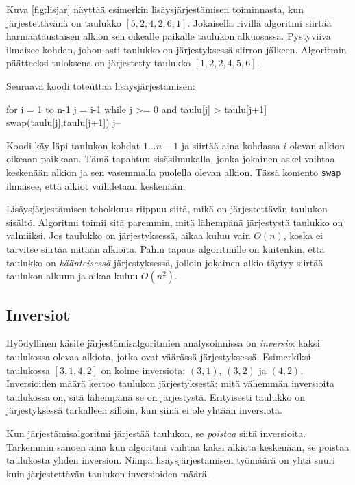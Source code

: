 Kuva \ref{fig:lisjar} näyttää esimerkin lisäysjärjestämisen
toiminnasta, kun järjes\-tettävänä on taulukko $[5,2,4,2,6,1]$.
Jokaisella rivillä algoritmi siirtää harmaataustaisen
alkion sen oikealle paikalle taulukon alkuosassa.
Pystyviiva ilmaisee kohdan, johon asti taulukko on järjestyksessä
siirron jälkeen.
Algoritmin päätteeksi tuloksena on järjestetty taulukko $[1,2,2,4,5,6]$.

Seuraava koodi toteuttaa lisäysjärjestämisen:

\begin{code}
for i = 1 to n-1
    j = i-1
    while j >= 0 and taulu[j] > taulu[j+1]
        swap(taulu[j],taulu[j+1])
        j--
\end{code}

Koodi käy läpi taulukon kohdat $1 \dots n-1$
ja siirtää aina kohdassa $i$ olevan alkion
oikeaan paikkaan.
Tämä tapahtuu sisäsilmukalla,
jonka jokainen askel vaihtaa keskenään alkion
ja sen vasemmalla puolella olevan alkion.
Tässä komento \texttt{swap} ilmaisee,
että alkiot vaihdetaan keskenään.

Lisäysjärjestämisen tehokkuus riippuu siitä,
mikä on järjestettävän taulukon sisältö.
Algoritmi toimii sitä paremmin, mitä lähempänä järjestystä
taulukko on valmiiksi.
Jos taulukko on järjestyksessä,
aikaa kuluu vain $O(n)$, koska ei tarvitse siirtää
mitään alkioita.
Pahin tapaus algoritmille on kuitenkin, että taulukko on
\emph{käänteisessä} järjestyksessä,
jolloin jokainen alkio täytyy siirtää
taulukon alkuun ja aikaa kuluu $O(n^2)$.

\subsection{Inversiot}


Hyödyllinen käsite järjestämisalgoritmien analysoinnissa
on \emph{inversio}: kaksi taulukossa olevaa alkiota,
jotka ovat väärässä järjestyksessä.
Esimerkiksi taulukossa $[3,1,4,2]$ on kolme inversiota:
$(3,1)$, $(3,2)$ ja $(4,2)$.
Inversioiden määrä kertoo taulukon järjestyksestä:
mitä vähemmän inversioita taulukossa on,
sitä lähempänä se on järjestystä.
Erityisesti taulukko on järjestyksessä tarkalleen silloin,
kun siinä ei ole yhtään inversiota.

Kun järjestämisalgoritmi järjestää taulukon,
se \emph{poistaa} siitä inversioita.
Tarkemmin sanoen aina kun
algoritmi vaihtaa kaksi alkiota keskenään,
se poistaa taulukosta yhden inversion.
Niinpä lisäysjärjestämisen työmäärä on yhtä suuri
kuin järjestettävän taulukon inversioiden määrä.

